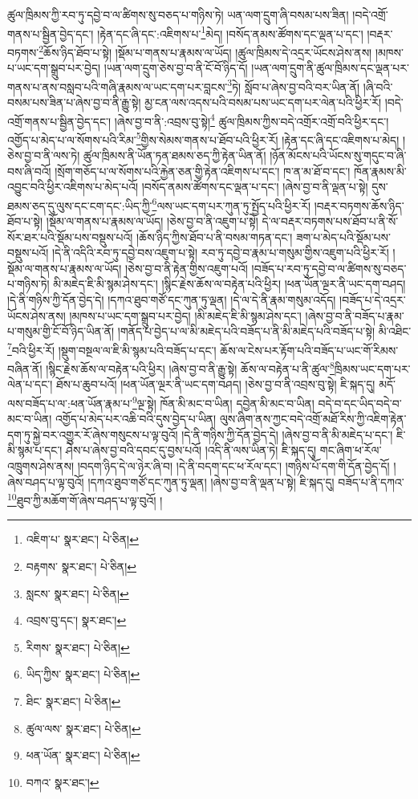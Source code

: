 ཚུལ་ཁྲིམས་ཀྱི་རབ་ཏུ་དབྱེ་བ་ལ་ཚིགས་སུ་བཅད་པ་གཉིས་ཏེ། ཡན་ལག་དྲུག་ཞི་བསམ་པས་ཟིན། །བདེ་འགྲོ་གནས་པ་སྦྱིན་བྱེད་དང་། །རྟེན་དང་ཞི་དང་:འཇིགས་པ་\footnote{འཇིག་པ་  སྣར་ཐང་།  པེ་ཅིན། }མེད། །བསོད་ནམས་ཚོགས་དང་ལྡན་པ་དང་། །བརྡར་བཏགས་\footnote{བརྟགས་  སྣར་ཐང་།  པེ་ཅིན། }ཆོས་ཉིད་ཐོབ་པ་སྟེ། །སྡོམ་པ་གནས་པ་རྣམས་ལ་ཡོད། །ཚུལ་ཁྲིམས་དེ་འདྲར་ཡོངས་ཤེས་ནས། །མཁས་པ་ཡང་དག་སྒྲུབ་པར་བྱེད། །ཡན་ལག་དྲུག་ཅེས་བྱ་བ་ནི་ངོ་བོ་ཉིད་དོ། །ཡན་ལག་དྲུག་ནི་ཚུལ་ཁྲིམས་དང་ལྡན་པར་གནས་པ་ནས་བསླབ་པའི་གཞི་རྣམས་ལ་ཡང་དག་པར་བླངས་\footnote{སླངས་  སྣར་ཐང་།  པེ་ཅིན། }ཏེ། སློབ་པ་ཞེས་བྱ་བའི་བར་ཡིན་ནོ། །ཞི་བའི་བསམ་པས་ཟིན་པ་ཞེས་བྱ་བ་ནི་རྒྱུ་སྟེ། མྱ་ངན་ལས་འདས་པའི་བསམ་པས་ཡང་དག་པར་ལེན་པའི་ཕྱིར་རོ། །བདེ་འགྲོ་གནས་པ་སྦྱིན་བྱེད་དང་། །ཞེས་བྱ་བ་ནི་:འབྲས་བུ་སྟེ།\footnote{འབྲས་བུ་དང་།  སྣར་ཐང་། } ཚུལ་ཁྲིམས་ཀྱིས་བདེ་འགྲོར་འགྲོ་བའི་ཕྱིར་དང་། འགྱོད་པ་མེད་པ་ལ་སོགས་པའི་རིམ་\footnote{རིགས་  སྣར་ཐང་།  པེ་ཅིན། }གྱིས་སེམས་གནས་པ་ཐོབ་པའི་ཕྱིར་རོ། །རྟེན་དང་ཞི་དང་འཇིགས་པ་མེད། །ཅེས་བྱ་བ་ནི་ལས་ཏེ། ཚུལ་ཁྲིམས་ནི་ཡོན་ཏན་ཐམས་ཅད་ཀྱི་རྟེན་ཡིན་ནོ། །ཉོན་མོངས་པའི་ཡོངས་སུ་གདུང་བ་ཞི་བས་ཞི་བའོ། །སྲོག་གཅོད་པ་ལ་སོགས་པའི་རྐྱེན་ཅན་གྱི་རྟེན་འཇིགས་པ་དང་། ཁ་ན་མ་ཐོ་བ་དང་། ཁོན་རྣམས་མི་འབྱུང་བའི་ཕྱིར་འཇིགས་པ་མེད་པའོ། །བསོད་ནམས་ཚོགས་དང་ལྡན་པ་དང་། །ཞེས་བྱ་བ་ནི་ལྡན་པ་སྟེ། དུས་ཐམས་ཅད་དུ་ལུས་དང་ངག་དང་:ཡིད་ཀྱི་\footnote{ཡིད་ཀྱིས་  སྣར་ཐང་།  པེ་ཅིན། }ལས་ཡང་དག་པར་ཀུན་ཏུ་སྤྱོད་པའི་ཕྱིར་རོ། །བརྡར་བཏགས་ཆོས་ཉིད་ཐོབ་པ་སྟེ། །སྡོམ་ལ་གནས་པ་རྣམས་ལ་ཡོད། །ཅེས་བྱ་བ་ནི་འཇུག་པ་སྟེ། དེ་ལ་བརྡར་བཏགས་པས་ཐོབ་པ་ནི་སོ་སོར་ཐར་པའི་སྡོམ་པས་བསྡུས་པའོ། །ཆོས་ཉིད་ཀྱིས་ཐོབ་པ་ནི་བསམ་གཏན་དང་། ཟག་པ་མེད་པའི་སྡོམ་པས་བསྡུས་པའོ། །དེ་ནི་འདིའི་རབ་ཏུ་དབྱེ་བས་འཇུག་པ་སྟེ། རབ་ཏུ་དབྱེ་བ་རྣམ་པ་གསུམ་གྱིས་འཇུག་པའི་ཕྱིར་རོ། །སྡོམ་ལ་གནས་པ་རྣམས་ལ་ཡོད། །ཅེས་བྱ་བ་ནི་རྟེན་གྱིས་འཇུག་པའོ། །བཟོད་པ་རབ་ཏུ་དབྱེ་བ་ལ་ཚིགས་སུ་བཅད་པ་གཉིས་ཏེ། མི་མཇེད་ཇི་མི་སྙམ་ཤེས་དང་། །སྙིང་རྗེས་ཆོས་ལ་བརྟེན་པའི་ཕྱིར། །ཕན་ཡོན་ལྔར་ནི་ཡང་དག་བཤད། །དེ་ནི་གཉིས་ཀྱི་དོན་བྱེད་དེ། །དཀའ་ཐུབ་གཙོ་དང་ཀུན་ཏུ་ལྡན། །དེ་ལ་དེ་ནི་རྣམ་གསུམ་འདོད། །བཟོད་པ་དེ་འདྲར་ཡོངས་ཤེས་ནས། །མཁས་པ་ཡང་དག་སྒྲུབ་པར་བྱེད། །མི་མཇེད་ཇི་མི་སྙམ་ཤེས་དང་། །ཞེས་བྱ་བ་ནི་བཟོད་པ་རྣམ་པ་གསུམ་གྱི་ངོ་བོ་ཉིད་ཡིན་ནོ། །གནོད་པ་བྱེད་པ་ལ་མི་མཇེད་པའི་བཟོད་པ་ནི་མི་མཇེད་པའི་བཟོད་པ་སྟེ། མི་འཐིང་\footnote{ཐིང་  སྣར་ཐང་།  པེ་ཅིན། }བའི་ཕྱིར་རོ། །སྡུག་བསྔལ་ལ་ཇི་མི་སྙམ་པའི་བཟོད་པ་དང་། ཆོས་ལ་ངེས་པར་རྟོག་པའི་བཟོད་པ་ཡང་གོ་རིམས་བཞིན་ནོ། །སྙིང་རྗེས་ཆོས་ལ་བརྟེན་པའི་ཕྱིར། །ཞེས་བྱ་བ་ནི་རྒྱུ་སྟེ། ཆོས་ལ་བརྟེན་པ་ནི་ཚུལ་\footnote{ཚུལ་ལས་  སྣར་ཐང་།  པེ་ཅིན། }ཁྲིམས་ཡང་དག་པར་ལེན་པ་དང་། ཐོས་པ་ཆུབ་པའོ། །ཕན་ཡོན་ལྔར་ནི་ཡང་དག་བཤད། །ཅེས་བྱ་བ་ནི་འབྲས་བུ་སྟེ། ཇི་སྐད་དུ། མདོ་ལས་བཟོད་པ་ལ་:ཕན་ཡོན་རྣམ་པ་\footnote{ཕན་ཡོན་  སྣར་ཐང་།  པེ་ཅིན། }ལྔ་སྟེ། ཁོན་མི་མང་བ་ཡིན། དབྱེན་མི་མང་བ་ཡིན། བདེ་བ་དང་ཡིད་བདེ་བ་མང་བ་ཡིན། འགྱོད་པ་མེད་པར་འཆི་བའི་དུས་བྱེད་པ་ཡིན། ལུས་ཞིག་ནས་ཀྱང་བདེ་འགྲོ་མཐོ་རིས་ཀྱི་འཇིག་རྟེན་དག་ཏུ་སྐྱེ་བར་འགྱུར་རོ་ཞེས་གསུངས་པ་ལྟ་བུའོ། །དེ་ནི་གཉིས་ཀྱི་དོན་བྱེད་དེ། །ཞེས་བྱ་བ་ནི་མི་མཇེད་པ་དང་། ཇི་མི་སྙམ་པ་དང་། ཤེས་པ་ཞེས་བྱ་བའི་དབང་དུ་བྱས་པའོ། །འདི་ནི་ལས་ཡིན་ཏེ། ཇི་སྐད་དུ། གང་ཞིག་ཕ་རོལ་འཁྲུགས་ཤེས་ནས། །བདག་ཉིད་དེ་ལ་ཉེར་ཞི་བ། །དེ་ནི་བདག་དང་ཕ་རོལ་དང་། །གཉིས་པོ་དག་གི་དོན་བྱེད་དོ། །ཞེས་བཤད་པ་ལྟ་བུའོ། །དཀའ་ཐུབ་གཙོ་དང་ཀུན་ཏུ་ལྡན། །ཞེས་བྱ་བ་ནི་ལྡན་པ་སྟེ། ཇི་སྐད་དུ། བཟོད་པ་ནི་དཀའ་\footnote{བཀའ་  སྣར་ཐང་། }ཐུབ་ཀྱི་མཆོག་གོ་ཞེས་བཤད་པ་ལྟ་བུའོ། །
